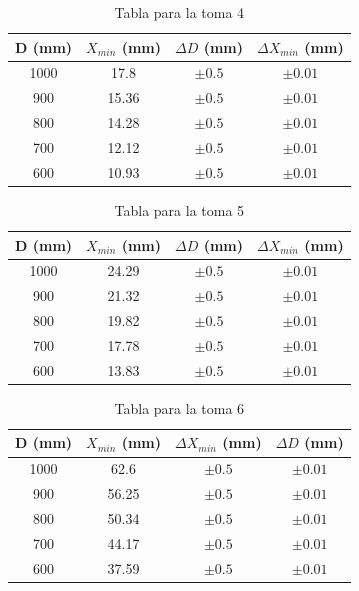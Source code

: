 \documentclass[11pt, a4paper, twocolumn]{article}
\begin{document}
\begin{table}[H]
    \caption{Tabla para la toma 4 }
    \centering
    \small
    \setlength{\tabcolsep}{4pt}
    \begin{tabular}{cccc}
        \hline
        D (mm) &   $X_{min}$ (mm) & $\Delta D$ (mm) & $\Delta X_{min}$ (mm)  \\
        \hline
            1000 &       17.8  & $\pm 0.5$        & $\pm 0.01$ \\
            900 &       15.36 & $\pm 0.5$        & $\pm 0.01$ \\
            800 &       14.28 & $\pm 0.5$        & $\pm 0.01$ \\
            700 &       12.12 & $\pm 0.5$        & $\pm 0.01$ \\
            600 &       10.93 & $\pm 0.5$        & $\pm 0.01$ \\
        \hline
    \end{tabular}
\end{table}

\vspace{0.5cm}

\begin{table}[H]
    \caption{Tabla para la toma 5 }
    \centering
    \small
    \setlength{\tabcolsep}{4pt}
    \begin{tabular}{cccc}
        \hline
        D (mm) &   $X_{min}$ (mm) & $\Delta D$ (mm) & $\Delta X_{min}$ (mm)  \\
        \hline
            1000 &       24.29 & $\pm 0.5$        & $\pm 0.01$ \\
            900 &       21.32 & $\pm 0.5$        & $\pm 0.01$ \\
            800 &       19.82 & $\pm 0.5$        & $\pm 0.01$ \\
            700 &       17.78 & $\pm 0.5$        & $\pm 0.01$ \\
            600 &       13.83 & $\pm 0.5$        & $\pm 0.01$ \\
        \hline
    \end{tabular}

\end{table}

\vspace{0.5cm}

\begin{table}[H]
    \caption{Tabla para la toma 6 }
    \centering
    \small
    \setlength{\tabcolsep}{4pt}
    \begin{tabular}{cccc}
        \hline
        D (mm) & $X_{min}$ (mm) & $\Delta X_{min}$ (mm) & $\Delta D$ (mm)  \\
        \hline
        1000 & 62.6  & $\pm 0.5$  & $\pm 0.01$  \\
        900  & 56.25 & $\pm 0.5$  & $\pm 0.01$  \\
        800  & 50.34 & $\pm 0.5$  & $\pm 0.01$  \\
        700  & 44.17 & $\pm 0.5$  & $\pm 0.01$  \\
        600  & 37.59 & $\pm 0.5$  & $\pm 0.01$  \\
        \hline
    \end{tabular}
\end{table}
\end{document}
